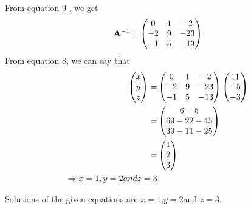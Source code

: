 \documentclass[two column]{article}
\begin{document}
\begin{enumerate}
                    From equation 9 , we get
                    \begin{align}
                    \mathbf{A}^{-1}=&\begin{pmatrix}0 & 1 & -2 \\ -2 & 9 &-23 \\ -1 & 5 & -13\end{pmatrix}\\
                    \end{align}
                    From equation 8, we can say that
                    \begin{align}
                    \begin{pmatrix}x\\y\\z\end{pmatrix}=&\begin{pmatrix}0 & 1 & -2\\ -2& 9 & -23 \\ -1 & 5 & -13\end{pmatrix}\begin{pmatrix}11\\-5\\-3\end{pmatrix}\\
                    =&\begin{pmatrix}6-5\\69-22-45\\39-11-25\end{pmatrix}\\
                    =&\begin{pmatrix}1\\2\\3\end{pmatrix}\\
                    \Rightarrow  x=1, y=2 and z=3 \\
                    \end{align}
                     \end{enumerate}
                     
                     
                    Solutions of the given equations are $x=1$,$y=2 $and $ z=3$. 
                    
                    
                    
\end{document}
